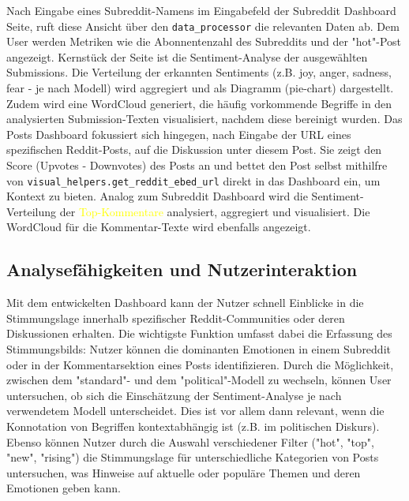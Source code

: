 Nach Eingabe eines Subreddit-Namens im Eingabefeld der Subreddit Dashboard Seite, ruft diese Ansicht über den \verb|data_processor| die relevanten Daten ab. Dem User werden Metriken wie die Abonnentenzahl des Subreddits und der "hot"-Post angezeigt. Kernstück der Seite ist die Sentiment-Analyse der ausgewählten Submissions. Die Verteilung der erkannten Sentiments (z.B. joy, anger, sadness, fear - je nach Modell) wird aggregiert und als Diagramm (pie-chart) dargestellt. Zudem wird eine WordCloud generiert, die häufig vorkommende Begriffe in den analysierten Submission-Texten visualisiert, nachdem diese bereinigt wurden. 
Das Posts Dashboard fokussiert sich hingegen, nach Eingabe der URL eines spezifischen Reddit-Posts, auf die Diskussion unter diesem Post. Sie zeigt den Score (Upvotes - Downvotes) des Posts an und bettet den Post selbst mithilfre von \verb|visual_helpers.get_reddit_ebed_url| direkt in das Dashboard ein, um Kontext zu bieten. Analog zum Subreddit Dashboard wird die Sentiment-Verteilung der \textcolor{yellow}{Top-Kommentare}  analysiert, aggregiert und visualisiert. Die WordCloud für die Kommentar-Texte wird ebenfalls angezeigt.

\subsection{Analysefähigkeiten und Nutzerinteraktion}

Mit dem entwickelten Dashboard kann der Nutzer schnell Einblicke in die Stimmungslage innerhalb spezifischer Reddit-Communities oder deren Diskussionen erhalten. Die wichtigste Funktion umfasst dabei die Erfassung des Stimmungsbilds: Nutzer können die dominanten Emotionen in einem Subreddit oder in der Kommentarsektion eines Posts identifizieren. Durch die Möglichkeit, zwischen dem "standard"- und dem "political"-Modell zu wechseln, können User untersuchen, ob sich die Einschätzung der Sentiment-Analyse je nach verwendetem Modell unterscheidet. Dies ist vor allem dann relevant, wenn die Konnotation von Begriffen kontextabhängig ist (z.B. im politischen Diskurs).
Ebenso können Nutzer durch die Auswahl verschiedener Filter ("hot", "top", "new", "rising") die Stimmungslage für unterschiedliche Kategorien von Posts untersuchen, was Hinweise auf aktuelle oder populäre Themen und deren Emotionen geben kann.


